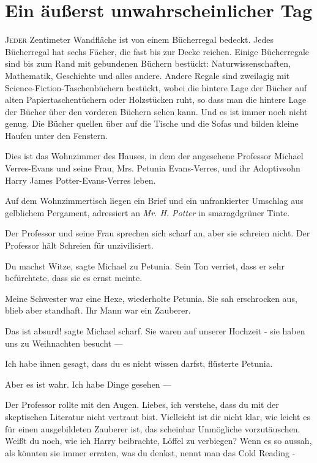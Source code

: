 \chapter{Ein äußerst unwahrscheinlicher Tag}

\lettrine{J}{eder} Zentimeter Wandfläche ist von einem Bücherregal bedeckt.
Jedes Bücherregal hat sechs Fächer, die fast bis zur Decke reichen. Einige
Bücherregale sind bis zum Rand mit gebundenen Büchern bestückt:
Naturwissenschaften, Mathematik, Geschichte und alles andere. Andere Regale sind
zweilagig mit Science-Fiction-Taschenbüchern bestückt, wobei die hintere Lage
der Bücher auf alten Papiertaschentüchern oder Holzstücken ruht, so dass man die
hintere Lage der Bücher über den vorderen Büchern sehen kann. Und es ist immer
noch nicht genug. Die Bücher quellen über auf die Tische und die Sofas und
bilden kleine Haufen unter den Fenstern.

Dies ist das Wohnzimmer des Hauses, in dem der angesehene Professor Michael
Verres-Evans und seine Frau, Mrs. Petunia Evans-Verres, und ihr Adoptivsohn
Harry James Potter-Evans-Verres leben.

Auf dem Wohnzimmertisch liegen ein Brief und ein unfrankierter Umschlag aus
gelblichem Pergament, adressiert an \emph{Mr. H. Potter} in smaragdgrüner Tinte.

Der Professor und seine Frau sprechen sich scharf an, aber sie schreien nicht.
Der Professor hält Schreien für unzivilisiert.

\glqq Du machst Witze\grqq{}, sagte Michael zu Petunia. Sein Ton verriet, dass
er sehr befürchtete, dass sie es ernst meinte.

\glqq Meine Schwester war eine Hexe\grqq{}, wiederholte Petunia. Sie sah
erschrocken aus, blieb aber standhaft. \glqq Ihr Mann war ein Zauberer.\grqq{}

\glqq Das ist absurd!\grqq{} sagte Michael scharf. \glqq Sie waren auf unserer
Hochzeit - sie haben uns zu Weihnachten besucht ---\grqq{}

\glqq Ich habe ihnen gesagt, dass du es nicht wissen darfst\grqq{}, flüsterte
Petunia.

\glqq Aber es ist wahr. Ich habe Dinge gesehen ---\grqq{}

Der Professor rollte mit den Augen. \glqq Liebes, ich verstehe, dass du mit der
skeptischen Literatur nicht vertraut bist. Vielleicht ist dir nicht klar, wie
leicht es für einen ausgebildeten Zauberer ist, das scheinbar Unmögliche
vorzutäuschen. Weißt du noch, wie ich Harry beibrachte, Löffel zu verbiegen?
Wenn es so aussah, als könnten sie immer erraten, was du denkst, nennt man das
Cold Reading -\grqq{}

